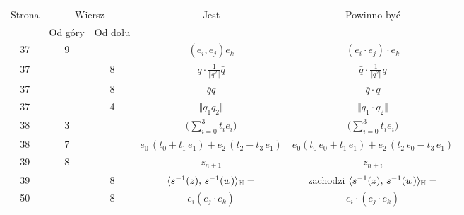 \documentclass[a4paper,11pt]{article}
\begin{document}
\begin{center}
  \begin{tabular}{|c|c|c|c|c|}
    \hline
    Strona & \multicolumn{2}{c|}{Wiersz} & Jest
    & Powinno być \\ \cline{2-3}
           & Od góry & Od dołu & & \\
    \hline
    37  &  9 & & $( e_{ i }, e_{ j } ) e_{ k }$
           & $( e_{ i } \cdot e_{ j } ) \cdot e_{ k }$ \\
    37  & &  8 & $q \cdot \frac{ 1 }{ \Vert q^{ 2 } \Vert } \bar{q}$
           & $\bar{q} \cdot \frac{ 1 }{ \Vert q^{ 2 } \Vert } q$ \\
    37  & &  8 & $\bar{q} q$ & $\bar{q} \cdot q$ \\
    37  & &  4 & $\Vert q_{ 1 } q_{ 2 } \Vert$ & $\Vert q_{ 1 } \cdot q_{ 2 } \Vert$ \\
    38  &  3 & & $\displaystyle \big( \sum_{ i = 0 }^{ 3 } t_{ i } e_{ i } )$
           & $\displaystyle \big( \sum_{ i = 0 }^{ 3 } t_{ i } e _{ i } \big)$ \\
    38  &  7 & & $e_{ 0 } \, ( t_{ 0 } + t_{ 1 } \, e_{ 1 } )
                 + e_{ 2 } \, ( t_{ 2 } - t_{ 3 } \, e_{ 1 } )$
           & $e_{ 0 } ( t_{ 0 } \, e_{ 0 } + t_{ 1 } \, e_{ 1 } )
             + e_{ 2 } \, ( t_{ 2 } \, e_{ 0 } - t_{ 3 } \, e_{ 1 } )$ \\
    39  &  8 & & $z_{ n + 1 }$ & $z_{ n + i }$ \\
    39  & &  8 & $\langle s^{ -1 }( z ), \, s^{ -1 }( w ) \rangle_{ \mathbb{H} } =$
           & zachodzi $\langle s^{ -1 }( z ), \, s^{ -1 }( w ) \rangle_{ \mathbb{H} } =$ \\
    50  & &  8 & $e_{ i } ( e_{ j } \cdot e_{ k } )$
           & $e_{ i } \cdot ( e_{ j } \cdot e_{ k } )$ \\
    \hline
  \end{tabular}






\end{center}
\end{document}
